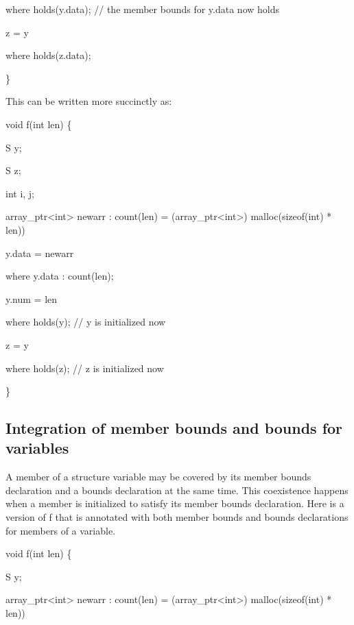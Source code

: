 \documentclass[]{article}
\begin{document}
where holds(y.data); // the member bounds for y.data now holds

z = y

where holds(z.data);

\}

\protect\hypertarget{ux5fToc420589202}{}{\protect\hypertarget{ux5fToc422906993}{}{\protect\hypertarget{ux5fToc424307708}{}{}}}

This can be written more succinctly as:

void f(int len) \{

S y;

S z;

int i, j;

array\_ptr\textless{}int\textgreater{} newarr : count(len) =
(array\_ptr\textless{}int\textgreater{}) malloc(sizeof(int) * len))

y.data = newarr

where y.data : count(len);

y.num = len

where holds(y); // y is initialized now

z = y

where holds(z); // z is initialized now

\}

\subsection{\texorpdfstring{\protect\hypertarget{ux5fToc426641099}{}{\protect\hypertarget{ux5fToc435434980}{}{\protect\hypertarget{ux5fToc437460811}{}{\protect\hypertarget{ux5fToc440445492}{}{\protect\hypertarget{ux5fToc440449274}{}{\protect\hypertarget{ux5fToc440551924}{}{}}}}}}Integration
of member bounds and bounds for variables
}{Integration of member bounds and bounds for variables }}\label{integration-of-member-bounds-and-bounds-for-variables}

A member of a structure variable may be covered by its member bounds
declaration and a bounds declaration at the same time. This coexistence
happens when a member is initialized to satisfy its member bounds
declaration. Here is a version of f that is annotated with both member
bounds and bounds declarations for members of a variable.

void f(int len) \{

S y;

array\_ptr\textless{}int\textgreater{} newarr : count(len) =
(array\_ptr\textless{}int\textgreater{}) malloc(sizeof(int) * len))
\end{document}
